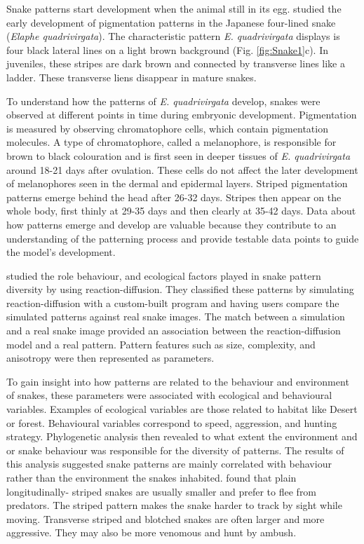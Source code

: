 Snake patterns start development when the animal still in its egg. \citet{murakami2018} studied the early development of pigmentation patterns in the Japanese four-lined snake (\textit{Elaphe quadrivirgata}). The characteristic pattern \textit{E. quadrivirgata} displays is four black lateral lines on a light brown background (Fig. \ref{fig:Snake1}c). In juveniles, these stripes are dark brown and connected by transverse lines like a ladder. These transverse liens disappear in mature snakes.
 
To understand how the patterns of \textit{E. quadrivirgata} develop, snakes were observed at different points in time during embryonic development. Pigmentation is measured by observing chromatophore cells, which contain pigmentation molecules. A type of chromatophore, called a melanophore, is responsible for brown to black colouration and is first seen in deeper tissues of \textit{E. quadrivirgata} around 18-21 days after ovulation. These cells do not affect the later development of melanophores seen in the dermal and epidermal layers. Striped pigmentation patterns emerge behind the head after 26-32 days. Stripes then appear on the whole body, first thinly at 29-35 days and then clearly at 35-42 days. Data about how patterns emerge and develop are valuable because they contribute to an understanding of the patterning process and provide testable data points to guide the model's development.

\citet{allen2013} studied the role behaviour, and ecological factors played in snake pattern diversity by using reaction-diffusion. They classified these patterns by simulating reaction-diffusion with a custom-built program and having users compare the simulated patterns against real snake images. The match between a simulation and a real snake image provided an association between the reaction-diffusion model and a real pattern. Pattern features such as size, complexity, and anisotropy were then represented as parameters.

To gain insight into how patterns are related to the behaviour and environment of snakes, these parameters were associated with ecological and behavioural variables. Examples of ecological variables are those related to habitat like Desert or forest. Behavioural variables correspond to speed, aggression, and hunting strategy. Phylogenetic analysis then revealed to what extent the environment and or snake behaviour was responsible for the diversity of patterns. The results of this analysis suggested snake patterns are mainly correlated with behaviour rather than the environment the snakes inhabited. \citet{allen2013} found that plain longitudinally- striped snakes are usually smaller and prefer to flee from predators. The striped pattern makes the snake harder to track by sight while moving. Transverse striped and blotched snakes are often larger and more aggressive. They may also be more venomous and hunt by ambush.

